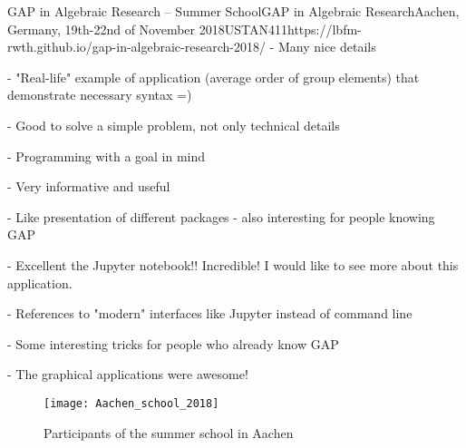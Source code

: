 \begin{event}{GAP in Algebraic Research -- Summer School}{GAP in Algebraic Research}{Aachen, Germany, 19th-22nd of November 2018}{USTAN}{41}{1}{https://lbfm-rwth.github.io/gap-in-algebraic-research-2018/}
- Many nice details

- "Real-life" example of application (average order of group elements) that demonstrate necessary syntax =)

- Good to solve a simple problem, not only technical details

- Programming with a goal in mind

- Very informative and useful

- Like presentation of different packages - also interesting for people knowing GAP

- Excellent the Jupyter notebook!! Incredible! I would like to see more about this application.

- References to "modern" interfaces like Jupyter instead of command line

- Some interesting tricks for people who already know GAP

- The graphical applications were awesome!

\begin{figure}[ht]
    \texttt{[image: Aachen\_school\_2018]}
\caption*{Participants of the summer school in Aachen}
\end{figure}

\end{event}

